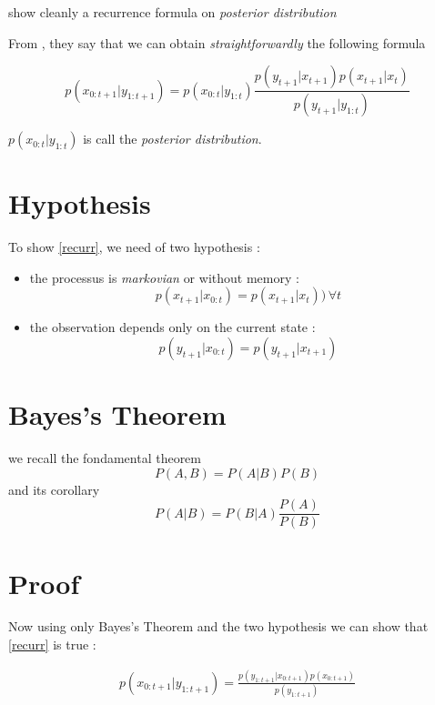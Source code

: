 \documentclass{article}
\begin{document}
\begin{center} 
show cleanly a recurrence formula on {\em posterior distribution}
\end{center}

From \cite{Freitas}, they say that we can obtain {\em straightforwardly}
the following formula

\begin{equation}\label{recurr}
p(x_{0:t+1}|y_{1:t+1}) = p(x_{0:t}|y_{1:t}) \frac{p(y_{t+1}|x_{t+1}) p(x_{t+1}|x_t)}{p(y_{t+1}|y_{1:t})}
\end{equation}

$p(x_{0:t}|y_{1:t})$ is call the {\em posterior distribution}. 

\section{Hypothesis}

To show \eqref{recurr}, we need of two hypothesis : 
\begin{itemize}
   \item the processus is {\em markovian } or without memory :  
   \begin{equation}\label{markov} 
   p(x_{t+1}| x_{0:t}) = p(x_{t+1} |x_t)) \, \forall t 
   \end{equation} 
   \item the observation depends only on the current state : 
   \begin{equation}\label{obs} 
   p(y_{t+1} | x_{0:t}) = p(y_{t+1} | x_{t+1})
   \end{equation} 
\end{itemize}

\section{Bayes's Theorem}

we recall the fondamental theorem 
$$
P(A,B) = P(A|B) P(B)
$$
and its corollary
$$
P(A|B) = P(B|A) \frac{P(A)}{P(B)}
$$
\section{Proof}

Now using only Bayes's Theorem and the two hypothesis we can show that \eqref{recurr} is true :

\begin{eqnarray*}
p(x_{0:t+1}|y_{1:t+1}) = \frac{p(y_{1:t+1}|x_{0:t+1}) p(x_{0:t+1})}{p(y_{1:t+1})} 
\end{eqnarray*}
\end{document}
